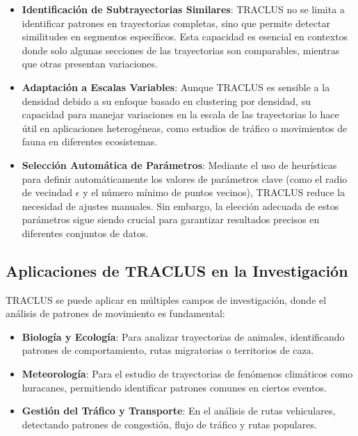 \begin{itemize}
    \item \textbf{Identificación de Subtrayectorias Similares}: TRACLUS no se limita a identificar patrones en trayectorias completas, sino que permite detectar similitudes en segmentos específicos. Esta capacidad es esencial en contextos donde solo algunas secciones de las trayectorias son comparables, mientras que otras presentan variaciones.
    
    \item \textbf{Adaptación a Escalas Variables}: Aunque TRACLUS es sensible a la densidad debido a su enfoque basado en clustering por densidad, su capacidad para manejar variaciones en la escala de las trayectorias lo hace útil en aplicaciones heterogéneas, como estudios de tráfico o movimientos de fauna en diferentes ecosistemas.
    
    \item \textbf{Selección Automática de Parámetros}: Mediante el uso de heurísticas para definir automáticamente los valores de parámetros clave (como el radio de vecindad $\epsilon$ y el número mínimo de puntos vecinos), TRACLUS reduce la necesidad de ajustes manuales. Sin embargo, la elección adecuada de estos parámetros sigue siendo crucial para garantizar resultados precisos en diferentes conjuntos de datos.
\end{itemize}

\subsection*{Aplicaciones de TRACLUS en la Investigación}
TRACLUS se puede aplicar en múltiples campos de investigación, donde el análisis de patrones de movimiento es fundamental:

\begin{itemize}
    \item \textbf{Biología y Ecología}: Para analizar trayectorias de animales, identificando patrones de comportamiento, rutas migratorias o territorios de caza.
    
    \item \textbf{Meteorología}: Para el estudio de trayectorias de fenómenos climáticos como huracanes, permitiendo identificar patrones comunes en ciertos eventos.
    
    \item \textbf{Gestión del Tráfico y Transporte}: En el análisis de rutas vehiculares, detectando patrones de congestión, flujo de tráfico y rutas populares.
\end{itemize}


